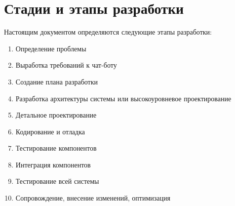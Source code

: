 \section{Стадии и этапы разработки}
\label{sec:dev}
Настоящим документом определяются следующие этапы разработки:
\begin{enumerate}
    \item
        Определение проблемы
    \item
        Выработка требований к чат-боту
    \item
        Создание плана разработки
    \item
        Разработка архитектуры системы или высокоуровневое проектирование
    \item
        Детальное проектирование
    \item
        Кодирование и отладка
    \item
        Тестирование компонентов
    \item
        Интеграция компонентов
    \item
        Тестирование всей системы
    \item
        Сопровождение, внесение изменений, оптимизация
\end{enumerate}
